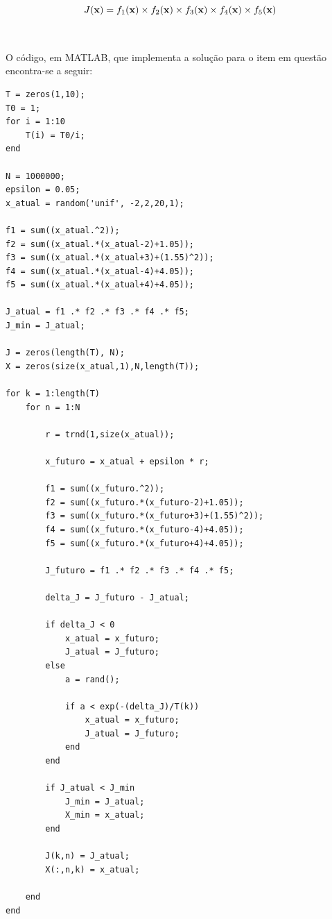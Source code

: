 \documentclass{report}
\begin{document}
\begin{equation*}
J(\text{\textbf{x}}) = f_1(\text{\textbf{x}}) \times f_2(\text{\textbf{x}}) \times f_3(\text{\textbf{x}}) \times f_4(\text{\textbf{x}}) \times f_5(\text{\textbf{x}})
\end{equation*}\\

\paragraph{} O código, em MATLAB, que implementa a solução para o item em questão encontra-se a seguir:\\

\begin{lstlisting}
T = zeros(1,10);
T0 = 1;
for i = 1:10
    T(i) = T0/i;
end

N = 1000000;
epsilon = 0.05;
x_atual = random('unif', -2,2,20,1);

f1 = sum((x_atual.^2));
f2 = sum((x_atual.*(x_atual-2)+1.05));
f3 = sum((x_atual.*(x_atual+3)+(1.55)^2));
f4 = sum((x_atual.*(x_atual-4)+4.05));
f5 = sum((x_atual.*(x_atual+4)+4.05));

J_atual = f1 .* f2 .* f3 .* f4 .* f5;
J_min = J_atual;

J = zeros(length(T), N);
X = zeros(size(x_atual,1),N,length(T));

for k = 1:length(T)
    for n = 1:N
        
        r = trnd(1,size(x_atual));
        
        x_futuro = x_atual + epsilon * r;
        
        f1 = sum((x_futuro.^2));
        f2 = sum((x_futuro.*(x_futuro-2)+1.05));
        f3 = sum((x_futuro.*(x_futuro+3)+(1.55)^2));
        f4 = sum((x_futuro.*(x_futuro-4)+4.05));
        f5 = sum((x_futuro.*(x_futuro+4)+4.05));
        
        J_futuro = f1 .* f2 .* f3 .* f4 .* f5;
        
        delta_J = J_futuro - J_atual;
        
        if delta_J < 0
            x_atual = x_futuro;
            J_atual = J_futuro;
        else
            a = rand();
            
            if a < exp(-(delta_J)/T(k))
                x_atual = x_futuro;
                J_atual = J_futuro;
            end
        end
        
        if J_atual < J_min
            J_min = J_atual;
            X_min = x_atual;
        end
        
        J(k,n) = J_atual;
        X(:,n,k) = x_atual;
        
    end
end
            
\end{lstlisting}
\end{document}
